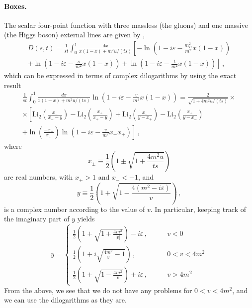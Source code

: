 \documentclass[12pt,a4wide]{article}
\begin{document}
\paragraph{Boxes.} The scalar four-point function with three massless (the gluons) and one massive (the Higgs boson) external lines are given by \cite{BAURGLOVER}, 
\begin{multline}
  \label{eq:box}
	D(s, t) = \frac{1}{st} \int_{0}^{1} \frac{\mathrm{d}x}{x(1-x)+m^2u/(ts)} \left [- \ln\left ( 1 - i \varepsilon - \frac{m_H^2}{m^2} x (1-x) \right )\right. \\ \left.
	+ \ln\left ( 1 - i \varepsilon - \frac{s}{m^2} x (1-x) \right ) + \ln\left ( 1 - i \varepsilon - \frac{t}{m^2} x (1-x) \right ) \right ] \,, 
\end{multline}
which can be expressed in terms of complex dilogarithms by using the exact result
\begin{multline}
  \label{eq:ci-dilogs}
  \frac{1}{st} \int_{0}^{1} \frac{dx}{x(1-x)+m^2u/(ts)} \ln\left ( 1 - i \varepsilon - \frac{v}{m^2} x (1-x) \right )= \frac{2}{\sqrt{1+4m^2u/(ts)}} \times  \\ \times
  \left[
    \mathrm{Li}_2\left(\frac{x_-}{x_--y}\right)-\mathrm{Li}_2\left(\frac{x_+}{x_+-y}\right)
    +\mathrm{Li}_2\left(\frac{x_-}{y-x_+}\right)-\mathrm{Li}_2\left(\frac{x_+}{y-x_-}\right)
    \right.
    \\ \left.
    + \ln\left( \frac{-x_{-}}{x_{+}} \right) \ln\left ( 1 - i \varepsilon - \frac{v}{m^2}x_-x_+ \right )
    \right]\,,
  \end{multline}
  where
  \begin{equation}
    \label{eq:xpm}
    	x_{\pm} \equiv \frac{1}{2} \left ( 1 \pm \sqrt{1 + \frac{4m^2 u}{ts}} \right )
  \end{equation}
are real numbers, with $x_+>1$ and $x_-<-1$, and
\begin{equation}
  \label{eq:y-def}
  y \equiv \frac{1}{2} \left ( 1 + \sqrt{1 - \frac{4(m^2 - i \varepsilon)}{v}} \right ) \,,
\end{equation}
is a complex number according to the value of $v$. In particular, keeping track of the imaginary part of $y$ yields
\begin{equation}
  \label{eq:y-implementation}
y = \left\{
  \begin{split}
  \frac{1}{2}\left(1+\sqrt{1+\frac{4m^2}{|v|}}\right)-i\varepsilon\,,& \qquad v<0\\
  \frac{1}{2}\left(1+i\sqrt{\frac{4m^2}{v}-1}\right)\,,& \qquad 0<v<4 m^2\\
    \frac{1}{2}\left(1+\sqrt{1-\frac{4m^2}{v}}\right)+i\varepsilon\,,& \qquad v>4m^2
  \end{split}
  \right.
\end{equation}
From the above, we see that we do not have any problems for
$0<v<4 m^2$, and we can use the dilogarithms as they are.
\end{document}
